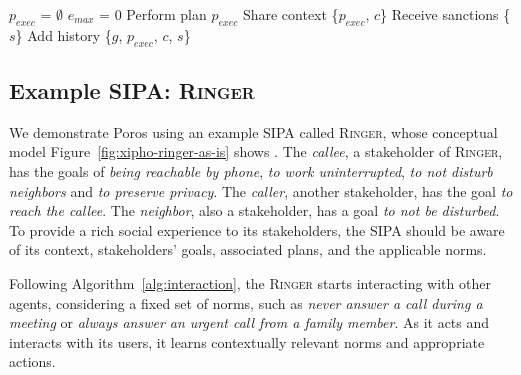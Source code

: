 \documentclass[11pt,          %
               phd,           %
               onehalfspacing %
               ]{ncsuthesis}
\newcommand{\fsc}{\textsc}
\newcommand{\fsl}{\textsl}
\newcommand{\frameworkB}{Poros\xspace}
\newcommand{\ringer}{\fsc{Ringer}\xspace}
\newcommand{\nsa}[1]{\textcolor{green!50!black}{NSA:~~#1}}
\begin{document}
\begin{algorithm}[!htb]
\caption{Interaction and learning in \frameworkB.}
\label{alg:interaction}
{}
$p_{exec}$ = $\emptyset$\;
$e_{max}$ = $0$\; 
\ForEach{$p_i \in P \vdash (G \mid c)$}{
  $h$ = hasHistory($G$, $p$, $c$)\;
 \eIf{$h$}{
  $exp_i$ = predictExperience($p_i$, $c$, $h$)\;
  \If{$exp_i > e_{max}$}{
  $exp_{max}$ = $exp_i$\;
  $p_{exec}$ = $p_i$\;
  }
 }{
  $p_{exec}$ = $p_i$\;
 }
}
  Perform plan $p_{exec}$\;
  Share context \{$p_{exec}$, $c$\}\;
  Receive sanctions \{$s$\}\;
  Add history \{$g$, $p_{exec}$, $c$, $s$\}\;      
\end{algorithm}


        

\subsection{Example SIPA: \ringer}
\label{sec:ringer-framework}
We demonstrate \frameworkB using an example SIPA called \ringer,
whose conceptual model Figure~\ref{fig:xipho-ringer-as-is} shows 
\citep{Murukannaiah-AAMAS14-Xipho}. The \fsl{callee}, a
stakeholder of \ringer, has the goals of \fsl{being reachable by
phone}, \fsl{to work uninterrupted}, \fsl{to not disturb neighbors}
and \fsl{to preserve privacy}. The \fsl{caller}, another stakeholder,
has the goal \fsl{to reach the callee}.  The \fsl{neighbor}, also
a stakeholder, has a goal \fsl{to not be disturbed}. To provide a
rich social experience to its stakeholders, the SIPA should be aware
of its context, stakeholders' goals, associated plans, and the applicable 
norms. 


    
Following Algorithm~\ref{alg:interaction}, the \ringer starts
interacting with other agents, considering a fixed set of norms, such as
\fsl{never answer a call during a meeting} or \fsl{always answer an
urgent call from a family member}. As it acts and interacts with its
users, it learns contextually relevant norms and appropriate actions.
\end{document}
